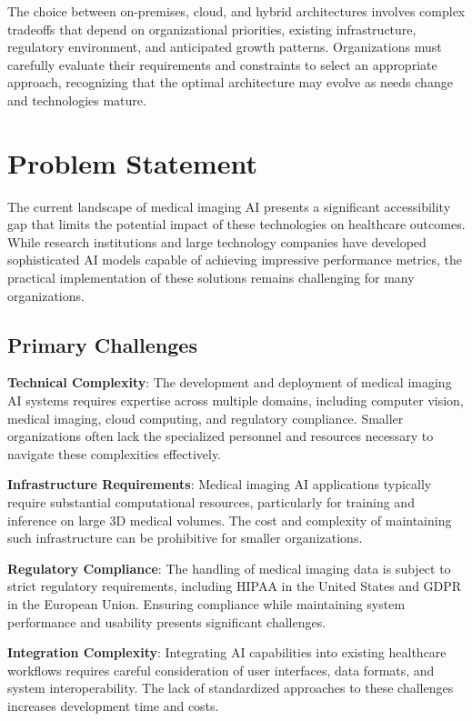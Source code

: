 \documentclass[12pt,a4paper]{article}
\begin{document}
The choice between on-premises, cloud, and hybrid architectures involves complex tradeoffs that depend on organizational priorities, existing infrastructure, regulatory environment, and anticipated growth patterns. Organizations must carefully evaluate their requirements and constraints to select an appropriate approach, recognizing that the optimal architecture may evolve as needs change and technologies mature.

\section{Problem Statement}

The current landscape of medical imaging AI presents a significant accessibility gap that limits the potential impact of these technologies on healthcare outcomes. While research institutions and large technology companies have developed sophisticated AI models capable of achieving impressive performance metrics, the practical implementation of these solutions remains challenging for many organizations.

\subsection{Primary Challenges}

\textbf{Technical Complexity}: The development and deployment of medical imaging AI systems requires expertise across multiple domains, including computer vision, medical imaging, cloud computing, and regulatory compliance. Smaller organizations often lack the specialized personnel and resources necessary to navigate these complexities effectively.

\textbf{Infrastructure Requirements}: Medical imaging AI applications typically require substantial computational resources, particularly for training and inference on large 3D medical volumes. The cost and complexity of maintaining such infrastructure can be prohibitive for smaller organizations.

\textbf{Regulatory Compliance}: The handling of medical imaging data is subject to strict regulatory requirements, including HIPAA in the United States and GDPR in the European Union. Ensuring compliance while maintaining system performance and usability presents significant challenges.

\textbf{Integration Complexity}: Integrating AI capabilities into existing healthcare workflows requires careful consideration of user interfaces, data formats, and system interoperability. The lack of standardized approaches to these challenges increases development time and costs.
\end{document}
